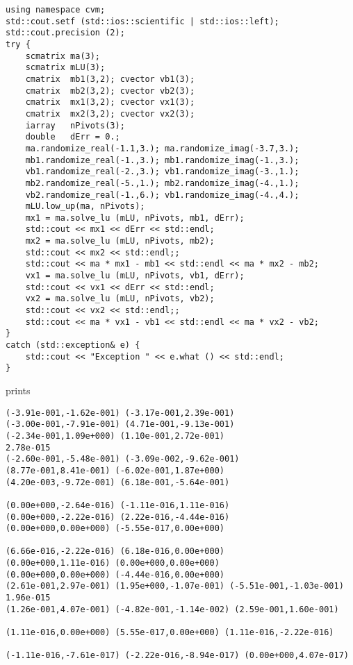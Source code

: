 \begin{Verbatim}
using namespace cvm;
std::cout.setf (std::ios::scientific | std::ios::left); 
std::cout.precision (2);
try {
    scmatrix ma(3);
    scmatrix mLU(3);
    cmatrix  mb1(3,2); cvector vb1(3);
    cmatrix  mb2(3,2); cvector vb2(3);
    cmatrix  mx1(3,2); cvector vx1(3);
    cmatrix  mx2(3,2); cvector vx2(3);
    iarray   nPivots(3);
    double   dErr = 0.;
    ma.randomize_real(-1.1,3.); ma.randomize_imag(-3.7,3.);
    mb1.randomize_real(-1.,3.); mb1.randomize_imag(-1.,3.);
    vb1.randomize_real(-2.,3.); vb1.randomize_imag(-3.,1.);
    mb2.randomize_real(-5.,1.); mb2.randomize_imag(-4.,1.);
    vb2.randomize_real(-1.,6.); vb1.randomize_imag(-4.,4.);
    mLU.low_up(ma, nPivots);
    mx1 = ma.solve_lu (mLU, nPivots, mb1, dErr);
    std::cout << mx1 << dErr << std::endl;
    mx2 = ma.solve_lu (mLU, nPivots, mb2);
    std::cout << mx2 << std::endl;;
    std::cout << ma * mx1 - mb1 << std::endl << ma * mx2 - mb2;
    vx1 = ma.solve_lu (mLU, nPivots, vb1, dErr);
    std::cout << vx1 << dErr << std::endl;
    vx2 = ma.solve_lu (mLU, nPivots, vb2);
    std::cout << vx2 << std::endl;;
    std::cout << ma * vx1 - vb1 << std::endl << ma * vx2 - vb2;
}
catch (std::exception& e) {
    std::cout << "Exception " << e.what () << std::endl;
}
\end{Verbatim}
prints
\begin{Verbatim}
(-3.91e-001,-1.62e-001) (-3.17e-001,2.39e-001)
(-3.00e-001,-7.91e-001) (4.71e-001,-9.13e-001)
(-2.34e-001,1.09e+000) (1.10e-001,2.72e-001)
2.78e-015
(-2.60e-001,-5.48e-001) (-3.09e-002,-9.62e-001)
(8.77e-001,8.41e-001) (-6.02e-001,1.87e+000)
(4.20e-003,-9.72e-001) (6.18e-001,-5.64e-001)

(0.00e+000,-2.64e-016) (-1.11e-016,1.11e-016)
(0.00e+000,-2.22e-016) (2.22e-016,-4.44e-016)
(0.00e+000,0.00e+000) (-5.55e-017,0.00e+000)

(6.66e-016,-2.22e-016) (6.18e-016,0.00e+000)
(0.00e+000,1.11e-016) (0.00e+000,0.00e+000)
(0.00e+000,0.00e+000) (-4.44e-016,0.00e+000)
(2.61e-001,2.97e-001) (1.95e+000,-1.07e-001) (-5.51e-001,-1.03e-001)
1.96e-015
(1.26e-001,4.07e-001) (-4.82e-001,-1.14e-002) (2.59e-001,1.60e-001)

(1.11e-016,0.00e+000) (5.55e-017,0.00e+000) (1.11e-016,-2.22e-016)

(-1.11e-016,-7.61e-017) (-2.22e-016,-8.94e-017) (0.00e+000,4.07e-017)
\end{Verbatim}
\newpage



